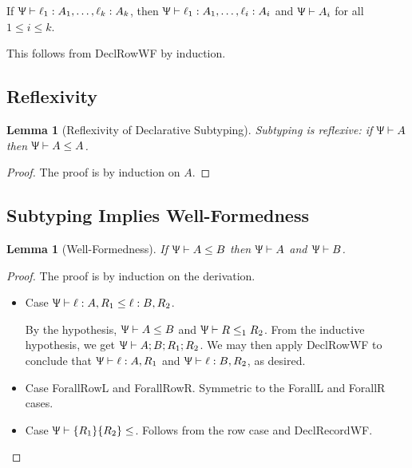 \documentclass{article}
\newtheorem{lem}[thm]{Lemma}
\newenvironment{manuallemma}[1]{%
  \renewcommand\themanuallemmainner{#1}%
  \manuallemmainner
}{\endmanuallemmainner}
\newcommand{\declCtx}{\Uppsi}
\newcommand{\rcd}[1]{\{#1\}}
\newcommand{\rowall}{\rotatebox[origin=c]{180}{\(\mathsf{R}\)}}
\newcommand{\rowvar}{\alpha_\rho}
\newcommand{\wf}[2]{#1 \vdash #2}
\newcommand{\subtypes}[3]{#1 \vdash #2 \le #3}
\begin{document}
\begin{manuallemma}{2.5}[Row Formedness]
  If \(\wf \declCtx {\ell_1 : A_1, \dots, \ell_k : A_k}\), then \(\wf \declCtx
  {\ell_1 : A_1, \dots, \ell_i : A_i}\) and \(\wf \declCtx A_i\) for all \(1 \le
  i \le k\).
\end{manuallemma}

This follows from DeclRowWF by induction.

\subsection{Reflexivity}
\begin{lem}[Reflexivity of Declarative Subtyping]
  Subtyping is reflexive: if \(\wf \declCtx A \) then \(\subtypes \declCtx A
  A\).
\end{lem}

\begin{proof}
The proof is by induction on \(A\).

  
\end{proof}

\subsection{Subtyping Implies Well-Formedness}

\begin{lem}[Well-Formedness]
  If \(\subtypes \declCtx A B\) then \(\wf \declCtx A\) and \(\wf \declCtx B\).
\end{lem}

\begin{proof}
  The proof is by induction on the derivation.
  \begin{itemize}
  \item Case \(\subtypes \declCtx {\ell : A, R_1} {\ell : B, R_2}\).

    By the hypothesis, \(\subtypes \declCtx A B\) and \(\subtypes \declCtx R_1
    R_2\). From the inductive hypothesis, we get \(\wf \declCtx {A; B; R_1;
      R_2}\). We may then apply DeclRowWF to conclude that \(\wf \declCtx {\ell
      : A, R_1}\) and \(\wf \declCtx {\ell : B, R_2}\), as desired.
  \item Case ForallRowL and ForallRowR. Symmetric to the ForallL and ForallR
    cases.
  \item Case \(\subtypes \declCtx {\rcd{R_1} {\rcd{R_2}}}\). Follows from the
    row case and DeclRecordWF.
  \end{itemize}
\end{proof}
\end{document}
